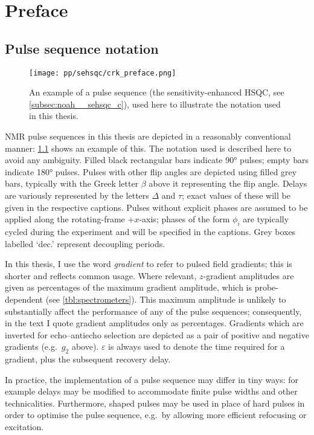 \chapter{Preface}

\section*{Pulse sequence notation}

\begin{figure}[ht]
    \centering
    \texttt{[image: pp/sehsqc/crk\_preface.png]}%
    \caption[Example pulse sequence to illustrate notation]{An example of a pulse sequence (the sensitivity-enhanced HSQC, see \cref{subsec:noah__sehsqc_c}), used here to illustrate the notation used in this thesis.}
    \label{fig:preface_sehsqc}
\end{figure}

NMR pulse sequences in this thesis are depicted in a reasonably conventional manner: \cref{fig:preface_sehsqc} shows an example of this.
The notation used is described here to avoid any ambiguity.
Filled black rectangular bars indicate \ang{90} pulses; empty bars indicate \ang{180} pulses.
Pulses with other flip angles are depicted using filled grey bars, typically with the Greek letter $\beta$ above it representing the flip angle.
Delays are variously represented by the letters $\Delta$ and $\tau$; exact values of these will be given in the respective captions.
Pulses without explicit phases are assumed to be applied along the rotating-frame $+x$-axis; phases of the form $\phi_i$ are typically cycled during the experiment and will be specified in the captions.
Grey boxes labelled `dec.' represent decoupling periods.

In this thesis, I use the word \textit{gradient} to refer to pulsed field gradients; this is shorter and reflects common usage.
Where relevant, $z$-gradient amplitudes are given as percentages of the maximum gradient amplitude, which is probe-dependent (see \cref{tbl:spectrometers}).
This maximum amplitude is unlikely to substantially affect the performance of any of the pulse sequences; consequently, in the text I quote gradient amplitudes only as percentages.
Gradients which are inverted for echo--antiecho selection are depicted as a pair of positive and negative gradients (e.g.\ $g_2$ above).
$\varepsilon$ is always used to denote the time required for a gradient, plus the subsequent recovery delay.

In practice, the implementation of a pulse sequence may differ in tiny ways: for example delays may be modified to accommodate finite pulse widths and other technicalities.
Furthermore, shaped pulses may be used in place of hard pulses in order to optimise the pulse sequence, e.g.\ by allowing more efficient refocusing or excitation.

